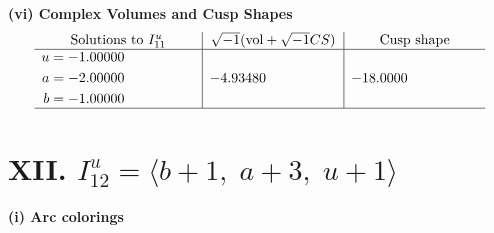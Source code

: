 \documentclass[1p]{elsarticle_modified}
\theoremstyle{definition}
\newcommand{\I}{\sqrt{-1}}
\begin{document}
\newpage\flushleft \textbf{(vi) Complex Volumes and Cusp Shapes}
$$\begin{array}{c|c|c}  
\text{Solutions to }I^u_{11}& \I (\text{vol} + \sqrt{-1}CS) & \text{Cusp shape}\\
 \hline 
\begin{aligned}
u &= -1.00000\phantom{ +0.000000I} \\
a &= -2.00000\phantom{ +0.000000I} \\
b &= -1.00000\phantom{ +0.000000I}\end{aligned}
 & -4.93480\phantom{ +0.000000I} & -18.0000\phantom{ +0.000000I}\\
 \hline 
 \end{array}$$\newpage\newpage\renewcommand{\arraystretch}{1}
\centering \section*{XII. $I^u_{12}= \langle b+1,\;a+3,\;u+1 \rangle$}
\flushleft \textbf{(i) Arc colorings}\\
\end{document}
